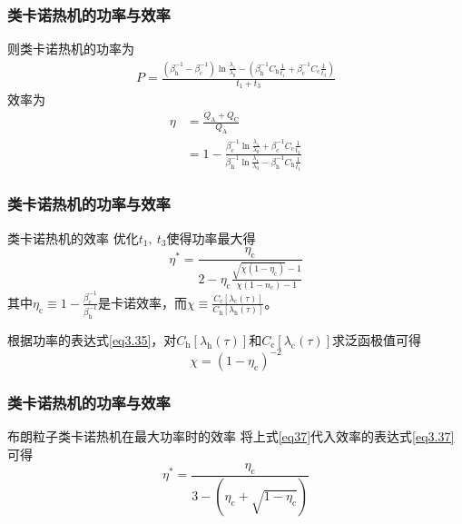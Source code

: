 \documentclass{beamer}
\begin{document}
\begin{frame}
\frametitle{类卡诺热机的功率与效率}
则类卡诺热机的功率为
\begin{equation}
    \begin{split}
        P=\frac{\left(\beta_{\mathrm{h}}^{-1}-\beta_{\mathrm{c}}^{-1}\right) \ln{\frac{\lambda_1}{\lambda_0}} - \left(\beta_{\mathrm{h}}^{-1} C_{\mathrm{h}} \frac{1}{t_1} + \beta_{\mathrm{c}}^{-1} C_{\mathrm{c}} \frac{1}{t_3}\right)}{t_1+t_3}
    \end{split}
    \label{eq3.35}
\end{equation}
\pause
效率为
\begin{equation}
    \begin{split}
        \eta &= \frac{Q_{\mathrm{A}} + Q_{\mathrm{C}}}{Q_{\mathrm{A}}}\\ 
        &=1- \frac{\beta_{\mathrm{c}}^{-1} \ln{\frac{\lambda_1}{\lambda_0}} + \beta_{\mathrm{c}}^{-1} C_{\mathrm{c}} \frac{1}{t_3}}{\beta_{\mathrm{h}}^{-1} \ln{\frac{\lambda_1}{\lambda_0}} - \beta_{\mathrm{h}}^{-1} C_{\mathrm{h}} \frac{1}{t_1}}
    \end{split}
    \label{3.20}
\end{equation}
\end{frame}

\begin{frame}
    \frametitle{类卡诺热机的功率与效率}
\begin{alertblock}{类卡诺热机的效率}
    优化$t_1,\ t_3$使得功率最大得
 \begin{equation}
    \eta^{*}=\frac{\eta_{\mathrm{c}}}{2-\eta_{\mathrm{c}} \frac{\sqrt{\chi\left(1-\eta_{\mathrm{c}}\right)}-1}{\chi\left(1-n_{\mathrm{c}}\right)-1}}
    \label{eq3.37}
\end{equation}
其中$\eta_{\mathrm{c}}\equiv 1-\frac{\beta_{\mathrm{c}}^{-1}}{\beta_{\mathrm{h}}^{-1}}$是卡诺效率，而$\chi\equiv\frac{C_{\mathrm{c}} [\lambda_{\mathrm{c}}(\tau)]}{C_{\mathrm{h}} [\lambda_{\mathrm{h}}(\tau)]}$。
\pause

根据功率的表达式\eqref{eq3.35}，对$C_{\mathrm{h}} [\lambda_{\mathrm{h}}(\tau)]$和$C_{\mathrm{c}} [\lambda_{\mathrm{c}}(\tau)]$求泛函极值可得
\begin{equation}
    \chi={(1-\eta_{\mathrm{c}})}^{-2}
    \label{eq37}
\end{equation}
\end{alertblock}
\end{frame}

\begin{frame}
\frametitle{类卡诺热机的功率与效率}
\begin{alertblock}{布朗粒子类卡诺热机在最大功率时的效率}
将上式\eqref{eq37}代入效率的表达式\eqref{eq3.37}可得 
\begin{equation}
    \eta^{*}=\frac{\eta_{\mathrm{c}}}{3-\left(\eta_{\mathrm{c}}+\sqrt{1-\eta_{\mathrm{c}}}\right)}
\end{equation}   
\end{alertblock}
\end{frame}
\end{document}
